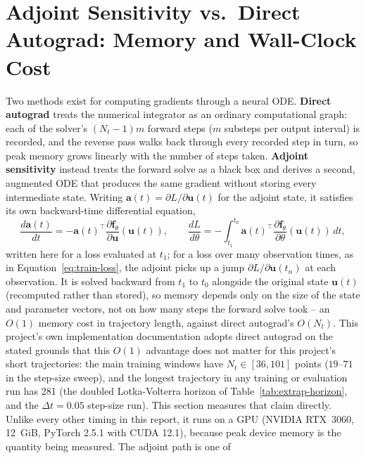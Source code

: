 \section{Adjoint Sensitivity vs.\ Direct Autograd: Memory and Wall-Clock Cost}
\label{sec:track-a}

Two methods exist for computing gradients through a neural ODE. \textbf{Direct
autograd} treats the numerical integrator as an ordinary computational
graph: each of the solver's $(N_t-1)m$ forward steps ($m$ substeps per
output interval) is recorded, and the reverse
pass walks back through every recorded step in turn, so peak memory grows
linearly with the number of steps taken. \textbf{Adjoint sensitivity}
\cite{chen2018neuralode} instead treats the forward solve as a black box and
derives a second, augmented ODE that produces the same gradient without
storing every intermediate state. Writing $\mathbf{a}(t) = \partial
L/\partial\mathbf{u}(t)$ for the adjoint state, it satisfies its own
backward-time differential equation,
\begin{equation}
\frac{d\mathbf{a}(t)}{dt} = -\mathbf{a}(t)^\top\frac{\partial \mathbf{f}_\theta}{\partial\mathbf{u}}(\mathbf{u}(t)),
\qquad
\frac{dL}{d\theta} = -\int_{t_1}^{t_0}\mathbf{a}(t)^\top\frac{\partial\mathbf{f}_\theta}{\partial\theta}(\mathbf{u}(t))\,dt,
\label{eq:adjoint}
\end{equation}
written here for a loss evaluated at $t_1$; for a loss over many observation
times, as in Equation~\ref{eq:train-loss}, the adjoint picks up a jump
$\partial L/\partial\mathbf u(t_n)$ at each observation. It is solved
backward from $t_1$ to $t_0$ alongside the original state
$\mathbf{u}(t)$ (recomputed rather than stored), so memory depends only on
the size of the state and parameter vectors, not on how many steps the
forward solve took -- an $O(1)$ memory cost in trajectory length, against
direct autograd's $O(N_t)$. This project's own implementation documentation
adopts direct autograd on the stated grounds that this $O(1)$ advantage does
not matter for this project's short trajectories: the main training windows
have $N_t\in[36,101]$ points ($19$--$71$ in the step-size sweep), and the
longest trajectory in any training or evaluation run has 281 (the doubled
Lotka-Volterra horizon of
Table~\ref{tab:extrap-horizon}, and the $\Delta t=0.05$ step-size run). This
section measures
that claim directly. Unlike every other timing in this report, it runs on a
GPU (NVIDIA RTX~3060, 12~GiB, PyTorch 2.5.1 with CUDA 12.1), because peak
device memory is the quantity being measured. The adjoint path is one of
